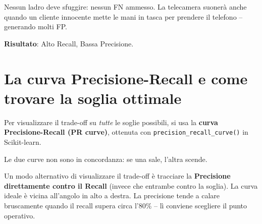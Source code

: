 \begin{exbox}
Nessun ladro deve sfuggire: nessun FN ammesso. La telecamera suonerà anche quando un cliente innocente mette le mani in tasca per prendere il telefono -- generando molti FP.

\textbf{Risultato}: Alto Recall, Bassa Precisione.
\end{exbox}

\section{La curva Precisione-Recall e come trovare la soglia ottimale}

Per visualizzare il trade-off su \emph{tutte} le soglie possibili, si usa la \textbf{curva Precisione-Recall (PR curve)}, ottenuta con \texttt{precision\_recall\_curve()} in Scikit-learn.

\begin{center}
\end{center}

Le due curve non sono in concordanza: se una sale, l'altra scende.

\begin{notebox}[La curva P vs.\ R]
Un modo alternativo di visualizzare il trade-off è tracciare la \textbf{Precisione direttamente contro il Recall} (invece che entrambe contro la soglia). La curva ideale è vicina all'angolo in alto a destra. La precisione tende a calare bruscamente quando il recall supera circa l'80\% -- lì conviene scegliere il punto operativo.
\end{notebox}

